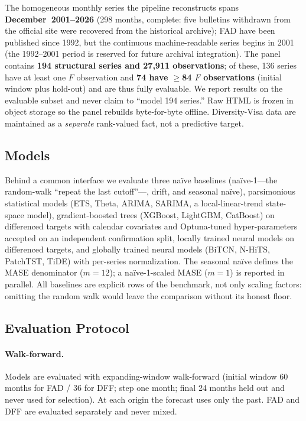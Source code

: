 \documentclass[runningheads]{llncs}
\begin{document}
The homogeneous monthly series the pipeline reconstructs spans
\textbf{December~2001--2026} (298 months, complete: five bulletins withdrawn from
the official site were recovered from the historical archive); FAD have been
published since 1992, but the continuous machine-readable series begins in 2001
(the 1992--2001 period is reserved for future archival integration). The panel contains
\textbf{194 structural series and 27{,}911 observations}; of these, 136 series have
at least one $F$ observation and \textbf{74 have $\geq$84 $F$ observations}
(initial window plus hold-out) and are thus fully evaluable. We report results on
the evaluable subset and never claim to ``model 194 series.'' Raw HTML is frozen in
object storage so the panel rebuilds byte-for-byte offline. Diversity-Visa data are
maintained as a \emph{separate} rank-valued fact, not a predictive target.

\subsection{Models}
\label{sec:models}

Behind a common interface we evaluate three naïve baselines (naïve-1---the
random-walk ``repeat the last cutoff''---, drift, and seasonal naïve), parsimonious
statistical models (ETS, Theta, ARIMA, SARIMA, a local-linear-trend state-space
model), gradient-boosted trees (XGBoost, LightGBM, CatBoost) on differenced targets
with calendar covariates and Optuna-tuned hyper-parameters accepted on an
independent confirmation split, locally trained neural models on differenced
targets, and globally trained neural models (BiTCN, N-HiTS, PatchTST, TiDE) with
per-series normalization. The seasonal naïve defines the MASE denominator
($m=12$); a naïve-1-scaled MASE ($m=1$) is reported in parallel. All baselines are
explicit rows of the benchmark, not only scaling factors: omitting the random walk
would leave the comparison without its honest floor.

\subsection{Evaluation Protocol}
\label{sec:eval}

\paragraph{Walk-forward.} Models are evaluated with expanding-window walk-forward
(initial window 60 months for FAD / 36 for DFF; step one month; final 24 months
held out and never used for selection). At each origin the forecast uses only the
past. FAD and DFF are evaluated separately and never mixed.
\end{document}
